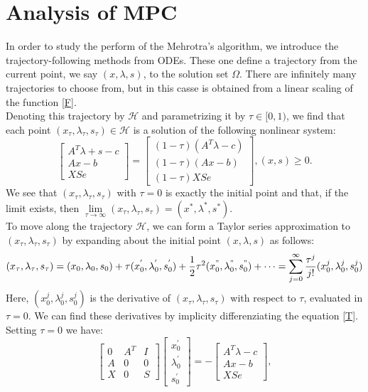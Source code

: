 \documentclass[a4paper,10 pt,titlepage,twoside]{book}
\theoremstyle{plain}
\theoremstyle{definition}
\theoremstyle{remark}
\begin{document}
\section{Analysis of MPC}
In order to study the perform of the Mehrotra's algorithm, we introduce the trajectory-following methods from ODEs. These one define a trajectory from the current point, we say $(x,\lambda,s)$, to the solution set $\Omega$. There are infinitely many trajectories to choose from, but in this casse is obtained from a linear scaling of the function \ref{F}.\\ Denoting this trajectory by $\mathcal{H}$ and parametrizing it by $\tau\in[0,1)$, we find that each point $(x_{\tau},\lambda_{\tau},s_{\tau})\in\mathcal{H}$ is a solution of the following nonlinear system:
\begin{equation}\label{T}
	\begin{bmatrix}
	A^{T}\lambda+s-c \\Ax-b \\XSe
	\end{bmatrix}=\begin{bmatrix}
	(1-\tau)(A^{T}\lambda-c)\\(1-\tau)(Ax-b)\\(1-\tau)XSe
	\end{bmatrix}, (x,s)\geq0.
\end{equation}
We see that $(x_{\tau},\lambda_{\tau},s_{\tau})$ with $\tau = 0$ is exactly the initial point and that, if the limit exists, then $\lim\limits_{\tau\to\infty}(x_{\tau},\lambda_{\tau},s_{\tau}) = (x^{*},\lambda^{*},s^{*})$.\\
To move along the trajectory $\mathcal{H}$, we can form a Taylor series approximation to $(x_{\tau},\lambda_{\tau},s_{\tau})$ by expanding about the initial point  $(x,\lambda,s)$ as follows:
\begin{equation*}
(x_{\tau},\lambda_{\tau},s_{\tau})=(x_{0},\lambda_{0},s_{0})+\tau(x_{0}^{'},\lambda_{0}^{'},s_{0}^{'})+\frac{1}{2}\tau^{2}(x_{0}^{"},\lambda_{0}^{"},s_{0}^{"})+\dots = \sum_{j=0}^{\infty}\frac{\tau^{j}}{j!}(x_{0}^{j},\lambda_{0}^{j},s_{0}^{j})
\end{equation*}
Here, $(x_{0}^{j},\lambda_{0}^{j},s_{0}^{j})$ is the derivative of $(x_{\tau},\lambda_{\tau},s_{\tau})$ with respect to $\tau$, evaluated in $\tau = 0$. We can find these derivatives by implicity differenziating the equation \ref{T}. Setting $\tau=0$ we have:
\begin{equation}
\begin{bmatrix}
0&A^{T}&I \\A&0&0\\X&0&S
\end{bmatrix}\begin{bmatrix}
x_{0}^{'}\\\lambda_{0}^{'}\\s_{0}^{'}
\end{bmatrix}=-\begin{bmatrix}
A^{T}\lambda-c\\Ax-b\\XSe
\end{bmatrix},
\end{equation}
\end{document}
